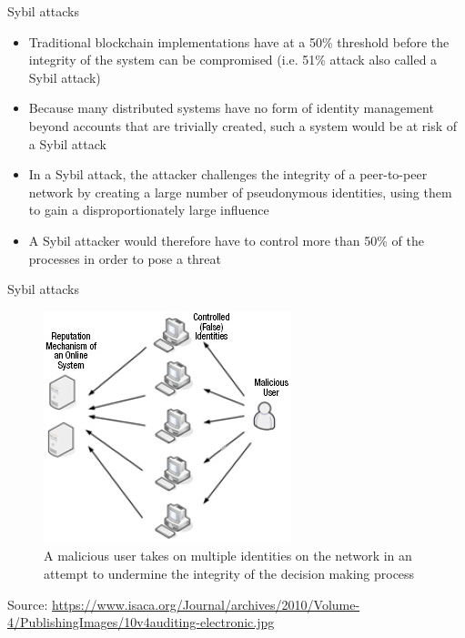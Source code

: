 \documentclass[11pt]{beamer}
\begin{document}
\begin{frame}{Sybil attacks}
	\begin{itemize}
		\item Traditional blockchain implementations have at a 50\% threshold before the integrity of the system can be compromised (i.e. 51\% attack also called a Sybil attack)
		\item  Because many distributed systems have no form of identity management beyond accounts that are trivially created, such a system would be at risk of a Sybil attack
		\item In a Sybil attack, the attacker challenges the integrity of a peer-to-peer network by creating a large number of pseudonymous identities, using them to gain a disproportionately large influence
		\item A Sybil attacker would therefore have to control more than 50\% of the processes in order to pose a threat
	\end{itemize}
\end{frame}


\begin{frame}{Sybil attacks}
	\begin{figure}[]
		\centering
		\includegraphics  [scale=0.5]{Images/sybil}
		\caption{A malicious user takes on multiple identities on the network in an attempt to undermine the integrity of the decision making process}
	\end{figure}
	\begin{tiny}
		Source: \href{https://www.isaca.org/Journal/archives/2010/Volume-4/Pages/JOnline-Auditing-Electronic-Auction-Systems.aspx}{https://www.isaca.org/Journal/archives/2010/Volume-4/PublishingImages/10v4auditing-electronic.jpg}
	\end{tiny}
\end{frame}
\end{document}
